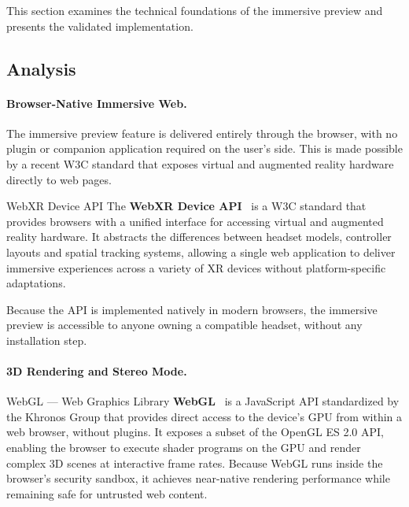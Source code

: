 This section examines the technical foundations of the immersive preview and presents the validated implementation.

\subsection{Analysis}

\paragraph{Browser-Native Immersive Web.}
The immersive preview feature is delivered entirely through the browser, with no plugin or companion application required on the user's side. This is made possible by a recent W3C standard that exposes virtual and augmented reality hardware directly to web pages.

\vspace{4pt}
\begin{conceptbox}[aiPurple]{WebXR Device API}
The \textbf{WebXR Device API}~\cite{webxr} is a W3C standard that provides browsers with a unified interface for accessing virtual and augmented reality hardware. It abstracts the differences between headset models, controller layouts and spatial tracking systems, allowing a single web application to deliver immersive experiences across a variety of XR devices without platform-specific adaptations.
\end{conceptbox}

Because the API is implemented natively in modern browsers, the immersive preview is
accessible to anyone owning a compatible headset, without any installation step.

\paragraph{3D Rendering and Stereo Mode.}\leavevmode

\vspace{4pt}
\begin{conceptbox}[aiPurple]{WebGL --- Web Graphics Library}
\textbf{WebGL}~\cite{webgl} is a JavaScript API standardized by the Khronos Group that provides direct access to the device's GPU from within a web browser, without plugins. It exposes a subset of the OpenGL ES 2.0 API, enabling the browser to execute shader programs on the GPU and render complex 3D scenes at interactive frame rates. Because WebGL runs inside the browser's security sandbox, it achieves near-native rendering performance while remaining safe for untrusted web content.
\end{conceptbox}

